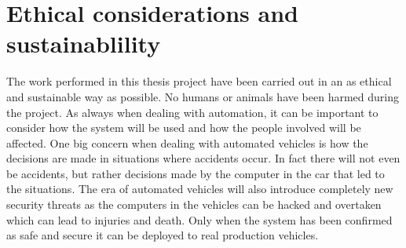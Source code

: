 \section{Ethical considerations and sustainablility}
The work performed in this thesis project have been carried out in an as ethical and sustainable way as possible. No humans or animals have been harmed during the project. As always when dealing with automation, it can be important to consider how the system will be used and how the people involved will be affected. One big concern when dealing with automated vehicles is how the decisions are made in situations where accidents occur. In fact there will not even be accidents, but rather decisions made by the computer in the car that led to the situations. The era of automated vehicles will also introduce completely new security threats as the computers in the vehicles can be hacked and overtaken which can lead to injuries and death. Only when the system has been confirmed as safe and secure it can be deployed to real production vehicles.